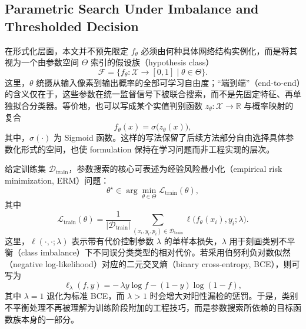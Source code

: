 \subsection{Parametric Search Under Imbalance and Thresholded Decision}

在形式化层面，本文并不预先限定 $f_{\theta}$ 必须由何种具体网络结构实例化，而是将其视为一个由参数空间 $\Theta$ 索引的假设族（hypothesis class）
\begin{equation}
    \mathcal{F}
    = \{f_{\theta} : \mathcal{X} \rightarrow [0,1] \mid \theta \in \Theta\}.
\end{equation}
这里，$\theta$ 统摄从输入像素到输出概率的全部可学习自由度；“端到端”（end-to-end）的含义仅在于，这些参数在统一监督信号下被联合搜索，而不是先固定特征、再单独拟合分类器。等价地，也可以写成某个实值判别函数 $z_{\theta}: \mathcal{X} \rightarrow \mathbb{R}$ 与概率映射的复合
\begin{equation}
    f_{\theta}(x) = \sigma\bigl(z_{\theta}(x)\bigr),
\end{equation}
其中，$\sigma(\cdot)$ 为 Sigmoid 函数。这样的写法保留了后续方法部分自由选择具体参数化形式的空间，也使 formulation 保持在学习问题而非工程实现的层次。

给定训练集 $\mathcal{D}_{\mathrm{train}}$，参数搜索的核心可表述为经验风险最小化（empirical risk minimization, ERM）问题：
\begin{equation}
    \theta^{\star}
    \in
    \arg\min_{\theta \in \Theta}
    \mathcal{L}_{\mathrm{train}}(\theta),
\end{equation}
其中
\begin{equation}
    \mathcal{L}_{\mathrm{train}}(\theta)
    =
    \frac{1}{|\mathcal{D}_{\mathrm{train}}|}
    \sum_{(x_i,y_i,p_i) \in \mathcal{D}_{\mathrm{train}}}
    \ell\bigl(f_{\theta}(x_i), y_i; \lambda\bigr).
\end{equation}
这里，$\ell(\cdot,\cdot;\lambda)$ 表示带有代价控制参数 $\lambda$ 的单样本损失，$\lambda$ 用于刻画类别不平衡（class imbalance）下不同误分类类型的相对代价。若采用伯努利负对数似然（negative log-likelihood）对应的二元交叉熵（binary cross-entropy, BCE），则可写为
\begin{equation}
    \ell_{\lambda}(f,y)
    = -\, \lambda y \log f - (1-y)\log(1-f),
\end{equation}
其中 $\lambda = 1$ 退化为标准 BCE，而 $\lambda > 1$ 时会增大对阳性漏检的惩罚。于是，类别不平衡处理不再被理解为训练阶段附加的工程技巧，而是参数搜索所依赖的目标函数族本身的一部分。

